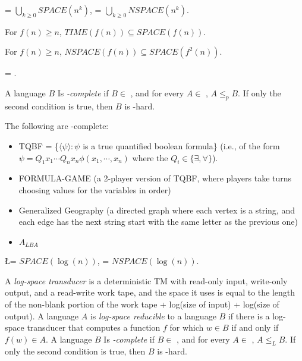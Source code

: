 \begin{definition}
\PSPACE = $\bigcup_{k \ge 0} SPACE(n^k)$, \NPSPACE = $\bigcup_{k \ge 0} NSPACE(n^k)$.
\end{definition}

\begin{theorem}
For $f(n) \ge n$, $TIME(f(n)) \subseteq SPACE(f(n))$.
\end{theorem}

\begin{theorem}
For $f(n) \ge n$, $NSPACE(f(n)) \subseteq SPACE(f^2(n))$.
\end{theorem}

\begin{corollary}
\PSPACE = \NPSPACE.
\end{corollary}

\begin{definition}
A language $B$ Is \emph{\PSPACE-complete} if $B \in$ \PSPACE, and for every $A \in$ \PSPACE, $A \le_p B$. If only the second condition is true, then $B$ is \PSPACE-hard.
\end{definition}

\begin{theorem}
The following are \PSPACE-complete:
\begin{itemize}
\item TQBF = \{$\langle\psi\rangle : \psi$ is a true quantified boolean formula\} (i.e., of the form $\psi = Q_1x_1\cdots Q_nx_n\phi(x_1,\cdots,x_n)$ where the $Q_i \in \{\exists, \forall\}$).
\item FORMULA-GAME (a 2-player version of TQBF, where players take turns choosing values for the variables in order)
\item Generalized Geography (a directed graph where each vertex is a string, and each edge has the next string start with the same letter as the previous one)
\item $A_{LBA}$
\end{itemize}
\end{theorem}

\begin{definition}
\L = $SPACE(\log(n))$, \NL = $NSPACE(\log(n))$.
\end{definition}

\begin{definition}
A \emph{log-space transducer} is a deterministic TM with read-only input, write-only output, and a read-write work tape, and the space it uses is equal to the length of the non-blank portion of the work tape + log(size of input) + log(size of output). A language $A$ is \emph{log-space reducible} to a language $B$ if there is a log-space transducer that computes a function $f$ for which $w \in B$ if and only if $f(w) \in A$. A language $B$ Is \emph{\NL-complete} if $B \in$ \NL, and for every $A \in$ \NL, $A \le_L B$. If only the second condition is true, then $B$ is \NL-hard.
\end{definition}

